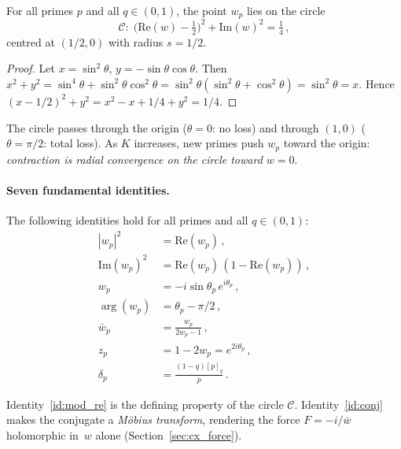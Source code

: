 \documentclass[12pt,a4paper]{article}
\begin{document}
\begin{thmbox}
\label{thm:circle}
For all primes $p$ and all $q \in (0,1)$, the point $w_p$ lies on the circle
\begin{equation}
  \mathcal{C}\colon\;
  \bigl(\mathrm{Re}(w) - \tfrac{1}{2}\bigr)^2 + \mathrm{Im}(w)^2
  = \tfrac{1}{4}\,,
  \label{eq:circle}
\end{equation}
centred at $(1/2, 0)$ with radius $s = 1/2$.
\end{thmbox}

\begin{proof}
Let $x = \sin^2\theta$, $y = -\sin\theta\cos\theta$.
Then $x^2 + y^2 = \sin^4\theta + \sin^2\theta\cos^2\theta
= \sin^2\theta(\sin^2\theta + \cos^2\theta) = \sin^2\theta = x$.
Hence $(x - 1/2)^2 + y^2 = x^2 - x + 1/4 + y^2 = 1/4$.
\end{proof}

The circle passes through the origin ($\theta = 0$: no loss) and through
$(1, 0)$ ($\theta = \pi/2$: total loss). As $K$ increases, new primes
push $w_p$ toward the origin: \emph{contraction is radial convergence
on the circle toward $w = 0$}.

\paragraph{Seven fundamental identities.}
The following identities hold for all primes and all $q \in (0,1)$:
\begin{align}
  |w_p|^2 &= \mathrm{Re}(w_p) \,,\tag{ID1}\label{id:mod_re}\\
  \mathrm{Im}(w_p)^2 &= \mathrm{Re}(w_p)\,(1 - \mathrm{Re}(w_p))\,,\tag{ID2}\label{id:im_parab}\\
  w_p &= -i\sin\theta_p\, e^{i\theta_p}\,,\tag{ID3}\label{id:polar}\\
  \arg(w_p) &= \theta_p - \pi/2\,,\tag{ID4}\label{id:arg}\\
  \bar{w}_p &= \frac{w_p}{2w_p - 1}\,,\tag{ID5}\label{id:conj}\\
  z_p &= 1 - 2w_p = e^{2i\theta_p}\,,\tag{ID6}\label{id:u1}\\
  \delta_p &= \frac{(1 - q)[p]_q}{p}\,.\tag{ID7}\label{id:qbracket}
\end{align}

Identity~\ref{id:mod_re} is the defining property of the circle $\mathcal{C}$.
Identity~\ref{id:conj} makes the conjugate a \emph{M\"obius transform},
rendering the force $F = -i/\bar{w}$ holomorphic in~$w$ alone
(Section~\ref{sec:cx_force}).
\end{document}
